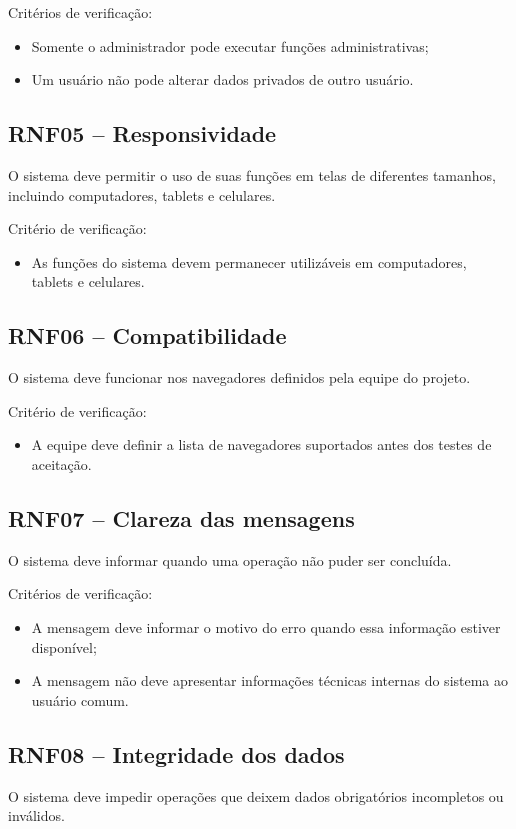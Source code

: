 \documentclass{scrreprt}
\newenvironment{fieldlist}
	{\renewcommand{\labelitemi}{--}\begin{itemize}}
	{\end{itemize}}
\begin{document}
Critérios de verificação:
\begin{fieldlist}
	\item Somente o administrador pode executar funções administrativas;
	\item Um usuário não pode alterar dados privados de outro usuário.
\end{fieldlist}

\subsection{RNF05 -- Responsividade}
O sistema deve permitir o uso de suas funções em telas de diferentes tamanhos,
incluindo computadores, tablets e celulares.

Critério de verificação:
\begin{fieldlist}
	\item As funções do sistema devem permanecer utilizáveis em computadores, tablets e celulares.
\end{fieldlist}

\subsection{RNF06 -- Compatibilidade}
O sistema deve funcionar nos navegadores definidos pela equipe do projeto.

Critério de verificação:
\begin{fieldlist}
	\item A equipe deve definir a lista de navegadores suportados antes dos testes de aceitação.
\end{fieldlist}

\subsection{RNF07 -- Clareza das mensagens}
O sistema deve informar quando uma operação não puder ser concluída.

Critérios de verificação:
\begin{fieldlist}
	\item A mensagem deve informar o motivo do erro quando essa informação estiver disponível;
	\item A mensagem não deve apresentar informações técnicas internas do sistema ao usuário comum.
\end{fieldlist}

\subsection{RNF08 -- Integridade dos dados}
O sistema deve impedir operações que deixem dados obrigatórios incompletos ou inválidos.
\end{document}
